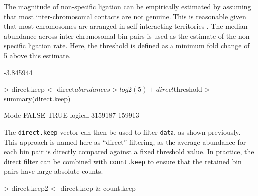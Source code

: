 \documentclass[12pt]{report}
\renewenvironment{Schunk}{\vspace{0pt}}{\vspace{0pt}}
\newcommand{\code}[1]{{\small\texttt{#1}}}
\begin{document}
The magnitude of non-specific ligation can be empirically estimated by assuming that most inter-chromosomal contacts are not genuine. 
This is reasonable given that most chromosomes are arranged in self-interacting territories \citep{bickmore2013spatial}.
The median abundance across inter-chromosomal bin pairs is used as the estimate of the non-specific ligation rate. 
Here, the threshold is defined as a minimum fold change of 5 above this estimate.

\begin{Schunk}
\begin{Soutput}
[1] -3.845944
\end{Soutput}
\begin{Sinput}
> direct.keep <- direct$abundances > log2(5) + direct$threshold
> summary(direct.keep)
\end{Sinput}
\begin{Soutput}
   Mode   FALSE    TRUE 
logical 3159187  159913 
\end{Soutput}
\end{Schunk}

The \code{direct.keep} vector can then be used to filter \code{data}, as shown previously.
This approach is named here as ``direct'' filtering, as the average abundance for each bin pair is directly compared against a fixed threshold value.
In practice, the direct filter can be combined with \code{count.keep} to ensure that the retained bin pairs have large absolute counts.

\begin{Schunk}
\begin{Sinput}
> direct.keep2 <- direct.keep & count.keep
\end{Sinput}
\end{Schunk}

% 
\end{document}
